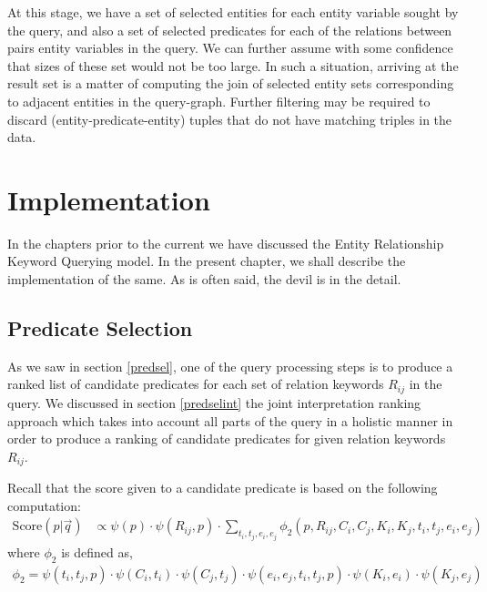 \documentclass[a4paper, twoside, 12pt]{report}
\begin{document}
At this stage, we have a set of selected entities for each entity variable sought by the query, and also a set of selected predicates for each of the relations between pairs entity variables in the query. We can further assume with some confidence that sizes of these set would not be too large. In such a situation, arriving at the result set is a matter of computing the join of selected entity sets corresponding  to adjacent entities in the query-graph. Further filtering may be required to discard (entity-predicate-entity) tuples that do not have matching triples in the data.




\chapter{Implementation}

In the chapters prior to the current we have discussed the Entity Relationship Keyword Querying model. In the present chapter, we shall describe the implementation of the same. As is often said, the devil is in the detail.

\section{Predicate Selection}
As we saw in section \ref{predsel}, one of the query processing steps is to produce a ranked list of candidate predicates for each set of relation keywords $R_{ij}$ in the query. We discussed in section \ref{predselint} the joint interpretation ranking approach which takes into account all parts of the query in a holistic manner in order to produce a ranking of candidate predicates for given relation keywords $R_{ij}$. 

Recall that the score given to a candidate predicate is based on the following computation:
\begin{align}
\text{Score}(p|\vec{q})& \propto \psi(p) \cdot \psi(R_{ij},p) \cdot \sum_{t_i,t_j,e_i,e_j} \phi_2(p, R_{ij}, C_i, C_j, K_i, K_j, t_i, t_j, e_i, e_j) \label{eq:predsel1}
\end{align}
where $\phi_2$ is defined as,
\begin{align}
\phi_2 =  \psi(t_i,t_j,p) \cdot \psi(C_i,t_i) \cdot \psi(C_j,t_j) \cdot \psi(e_i,e_j,t_i,t_j,p) \cdot \psi(K_i,e_i) \cdot \psi(K_j,e_j) \label{eq:phi2}
\end{align}
\end{document}
